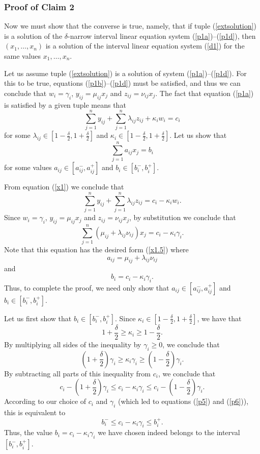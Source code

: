 \subsubsection{Proof of Claim 2}
Now we must show that the converse is true, namely, that if tuple
(\ref{extsolution}) is a solution of the $\delta$-narrow interval linear
equation system (\ref{p1a})--(\ref{p1d}), then $(x_1,\ldots,x_n)$ is a 
solution of the interval linear equation system (\ref{d1}) for the same 
values $x_1,\ldots,x_n$.

Let us assume tuple (\ref{extsolution}) is a solution of system
(\ref{p1a})--(\ref{p1d}).  For this to be true, equations
(\ref{p1b})--(\ref{p1d}) must be satisfied, and thus we can conclude that
$w_i=\gamma_i$, $y_{ij}=\mu_{ij}x_j$ and $z_{ij}=\nu_{ij}x_j$.
The fact that equation (\ref{p1a}) is satisfied by a given tuple means that
\begin{equation}
  \sum_{j=1}^n y_{ij} + \sum_{j=1}^n \lambda_{ij}z_{ij} + \kappa_i w_i = c_i
   \label{x1}
\end{equation}
for some $\lambda_{ij}\in[1-{\displaystyle\frac{\delta}{2}},1+{\displaystyle
\frac{\delta}{2}}]$ and $\kappa_i\in[1-{\displaystyle\frac{\delta}{2}},1+
{\displaystyle\frac{\delta}{2}}]$.  Let us show that
\begin{equation}
  \sum_{j=1}^n a_{ij}x_j = b_i \label{x1.5}
\end{equation}
for some values $a_{ij}\in[a_{ij}^-,a_{ij}^+]$ and $b_i\in[b_i^-,b_i^+]$.

From equation (\ref{x1}) we conclude that
$$
  \sum_{j=1}^n y_{ij} + \sum_{j=1}^n \lambda_{ij}z_{ij} = c_i - \kappa_i w_i.
$$
Since $w_i=\gamma_i$, $y_{ij}=\mu_{ij}x_j$ and $z_{ij}=\nu_{ij}x_j$, by
substitution we conclude that
$$
  \sum_{j=1}^n (\mu_{ij} + \lambda_{ij}\nu_{ij})x_j = c_i - \kappa_i\gamma_i.
$$
Note that this equation has the desired form (\ref{x1.5}) where
\begin{equation}
  a_{ij}=\mu_{ij}+\lambda_{ij}\nu_{ij}                                \label{A}
\end{equation}
and 
\begin{equation}
  b_i=c_i-\kappa_i\gamma_i.                                           \label{B}
\end{equation}
Thus, to complete the proof, we need only show that 
$a_{ij}\in[a_{ij}^-,a_{ij}^+]$ and $b_i\in[b_i^-,b_i^+]$.

Let us first show that $b_i\in[b_i^-,b_i^+]$.  Since $\kappa_i\in[1-
{\displaystyle\frac{\delta}{2}},1+{\displaystyle\frac{\delta}{2}}]$, we have
that
$$
  1+\frac{\delta}{2} \geq \kappa_i \geq 1-\frac{\delta}{2}.
$$
By multiplying all sides of the inequality by $\gamma_i\geq 0$, we conclude
that
$$
  (1+\frac{\delta}{2})\gamma_i \geq \kappa_i\gamma_i \geq
   (1-\frac{\delta}{2})\gamma_i.
$$
By subtracting all parts of this inequality from $c_i$, we conclude that
$$
  c_i-(1+\frac{\delta}{2})\gamma_i \leq c_i-\kappa_i\gamma_i \leq
   c_i-(1-\frac{\delta}{2})\gamma_i.
$$
According to our choice of $c_i$ and $\gamma_i$ (which led to equations 
(\ref{p5}) and (\ref{p6})), this is equivalent to
$$
  b_i^- \leq c_i-\kappa_i\gamma_i \leq b_i^+.
$$
Thus, the value $b_i=c_i-\kappa_i\gamma_i$ we have chosen indeed belongs
to the interval $[b_i^-,b_i^+]$.

